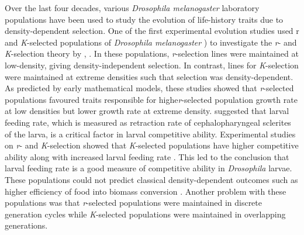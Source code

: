 Over the last four decades, various \textit{Drosophila melanogaster} laboratory populations have been used to study the evolution of life-history traits due to density-dependent selection. One of the first experimental evolution studies used r and \textit{K}-selected populations of \textit{Drosophila melanogaster} \citep{muellerTradeoffRselectionKselection1981} ) to investigate the \textit{r}- and \textit{K}-selection theory by  \citet{macarthurGENERALIZEDTHEOREMSNATURAL1962}, \citet*{macarthurTheoryIslandBiogeography1967}. In these populations, \textit{r}-selection lines were maintained at low-density, giving density-independent selection. In contrast, lines for \textit{K}-selection were maintained at extreme densities such that selection was density-dependent. As predicted by early mathematical models, these studies showed that \textit{r}-selected populations favoured traits responsible for highe\textit{r}-selected population growth rate at low densities but lower growth rate at extreme density. \citet{bakkerAnalysisFactorsWhich1962,burnetGeneticAnalysisLarval1977} suggested that larval feeding rate, which is measured as retraction rate of cephalopharyngeal sclerites of the larva, is a critical factor in larval competitive ability. Experimental studies on \textit{r}- and \textit{K}-selection showed that \textit{K}-selected populations have higher competitive ability along with increased larval feeding rate \citep{joshiEvolutionHigherFeeding1988}. This led to the conclusion that larval feeding rate is a good measure of competitive ability in \textit{Drosophila} larvae. These populations could not predict classical density-dependent outcomes such as higher efficiency of food into biomass conversion \citep{muellerDensitydependentNaturalSelection1990}. Another problem with these populations was that \textit{r}-selected populations were maintained in discrete generation cycles while \textit{K}-selected populations were maintained in overlapping generations. \\\\
